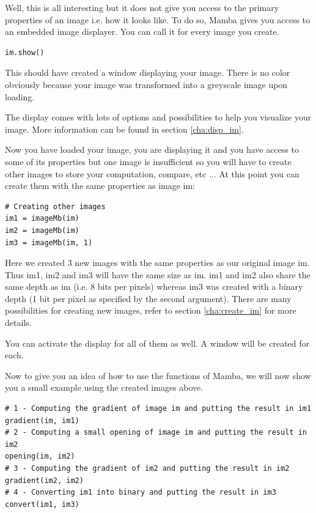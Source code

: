 \documentclass[a4paper,10pt,oneside]{article}
\begin{document}
Well, this is all interesting but it does not give you access to the primary
properties of an image i.e. how it looks like. To do so, Mamba gives you access to
an embedded image displayer. You can call it for every image you create.

\lstset{language=Python}
\begin{lstlisting}
im.show()
\end{lstlisting}

This should have created a window displaying your image. There is no color
obviously because your image was transformed into a greyscale image upon loading.

The display comes with lots of options and possibilities to help you visualize
your image. More information can be found in section \ref{cha:disp_im}.

Now you have loaded your image, you are displaying it and you have access to 
some of its properties but one image is insufficient so you will have to create
other images to store your computation, compare, etc ... At this point you can
create them with the same properties as image im:

\lstset{language=Python}
\begin{lstlisting}
# Creating other images
im1 = imageMb(im)
im2 = imageMb(im)
im3 = imageMb(im, 1)
\end{lstlisting}

Here we created 3 new images with the same properties as our original image im.
Thus im1, im2 and im3 will have the same size as im. im1 and im2 also share 
the same depth as im (i.e. 8 bits per pixels) whereas im3 was created with a 
binary depth (1 bit per pixel as specified by the second argument). There are many
possibilities for creating new images, refer to section \ref{cha:create_im} for
more details.

You can activate the display for all of them as well. A window will be created
for each.

Now to give you an idea of how to use the functions of Mamba, we will now show
you a small example using the created images above.

\lstset{language=Python}
\begin{lstlisting}
# 1 - Computing the gradient of image im and putting the result in im1
gradient(im, im1)
# 2 - Computing a small opening of image im and putting the result in im2
opening(im, im2)
# 3 - Computing the gradient of im2 and putting the result in im2
gradient(im2, im2)
# 4 - Converting im1 into binary and putting the result in im3
convert(im1, im3)
\end{lstlisting}
\end{document}

